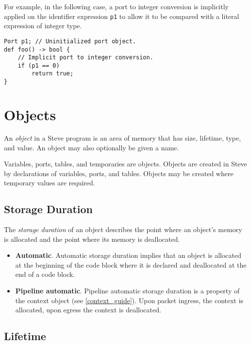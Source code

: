 For example, in the following case, a port to integer conversion is implicitly applied on the identifier expression \texttt{p1} to allow it to be compared with a literal expression of integer type.

\begin{minip}
\begin{lstlisting}
Port p1; // Uninitialized port object.
def foo() -> bool {
	// Implicit port to integer conversion.
	if (p1 == 0)
		return true;
}
\end{lstlisting}
\end{minip}

\section{Objects} \label{object_guide}

An \textit{object} in a Steve program is an area of memory that has size, lifetime, type, and value. An object may also optionally be given a name.

Variables, ports, tables, and temporaries are objects. Objects are created in Steve by declarations of variables, ports, and tables. Objects may be created where temporary values are required.

\subsection{Storage Duration} \label{storage_guide}

The \textit{storage duration} of an object describes the point where an object's memory is allocated and the point where its memory is deallocated.

\begin{itemize}
\item \textbf{Automatic}. Automatic storage duration implies that an object is allocated at the beginning of the code block where it is declared and deallocated at the end of a code block.
\item \textbf{Pipeline automatic}. Pipeline automatic storage duration is a property of the context object (see \ref{context_guide}). Upon packet ingress, the context is allocated, upon egress the context is deallocated.
\end{itemize}

\subsection{Lifetime} \label{lifetime_guide}

